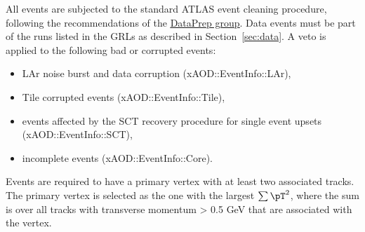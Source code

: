 All events are subjected to the standard ATLAS event cleaning procedure, following the recommendations of the \href{https://twiki.cern.ch/twiki/bin/viewauth/Atlas/DataPreparationCheckListForPhysicsAnalysis}{\underline{DataPrep group}}.
Data events must be part of the runs listed in the GRLs as described in Section~\ref{sec:data}. 
A veto is applied to the following bad or corrupted events:
\begin{itemize}
\item LAr noise burst and data corruption (xAOD::EventInfo::LAr),
\item Tile corrupted events (xAOD::EventInfo::Tile),
\item events affected by the SCT recovery procedure for single event upsets (xAOD::EventInfo::SCT),
\item incomplete events (xAOD::EventInfo::Core).
\end{itemize}

Events are required to have a primary vertex with at least two associated tracks. The primary vertex is selected as the one with the largest $\sum \pT^2$, where the sum is over all tracks with transverse momentum \pt > 0.5 GeV that are associated with the vertex.